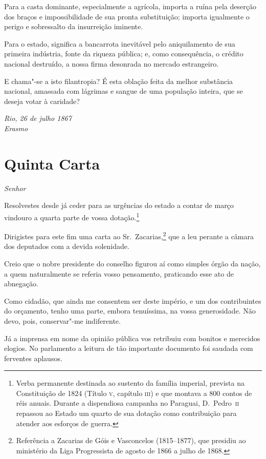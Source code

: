  Para a casta dominante, especialmente a agrícola, importa a ruína pela
deserção dos braços e impossibilidade de sua pronta substituição;
importa igualmente o perigo e sobressalto da insurreição iminente. 

 Para o estado, significa a bancarrota inevitável pelo aniquilamento de
sua primeira indústria, fonte da riqueza pública; e, como consequência,
o crédito nacional destruído, a nossa firma desonrada no mercado estrangeiro.

 E chama"-se a isto filantropia? É esta oblação feita da melhor
substância nacional, amassada com lágrimas e sangue de uma população
inteira, que se deseja votar à caridade?

\begin{flushright}
\textit{Rio, 26 de julho 1867\\
Erasmo}
\end{flushright} 

\chapter[Quinta Carta]{Quinta Carta }

\noindent\textit{Senhor}\smallskip

 Resolvestes desde já ceder para as urgências do estado a contar de
março vindouro a quarta parte de vossa
dotação.\footnote{ Verba permanente destinada ao sustento da família imperial, prevista na
Constituição de 1824 (Título \textsc{v}, capítulo \textsc{iii}) e que montava a 800
contos de réis anuais. Durante a dispendiosa campanha no Paraguai, D.~Pedro~\textsc{ii} 
repassou ao Estado um quarto de sua dotação como contribuição para atender aos esforços de guerra.}


 Dirigistes para este fim uma carta ao Sr.~Zacarias,\footnote{ Referência a 
Zacarias de Góis e Vasconcelos (1815--1877), que presidiu
ao ministério da Liga Progressista de agosto de 1866 a julho de 1868.}
 que a leu perante a câmara dos deputados com a devida solenidade.

 Creio que o nobre presidente do conselho figurou aí como simples órgão
da nação, a quem naturalmente se referia vosso pensamento, praticando
esse ato de abnegação. 

 Como cidadão, que ainda me consentem ser deste império, e um dos
contribuintes do orçamento, tenho uma parte, embora tenuíssima, na
vossa generosidade. Não devo, pois, conservar"-me indiferente. 

 Já a imprensa em nome da opinião pública vos retribuiu com bonitos e
merecidos elogios. No parlamento a leitura de tão importante documento
foi saudada com ferventes aplausos. 

